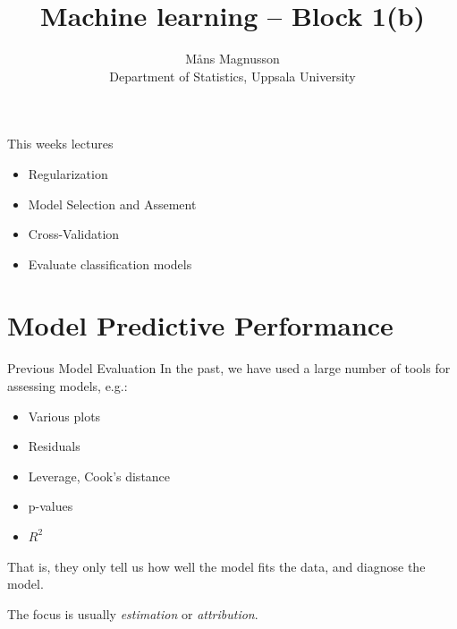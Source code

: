 \documentclass[10pt,handout]{beamer}
\title[]{{\color{black}Machine learning -- Block 1(b)}}
\author[]{M{\aa}ns Magnusson\\Department of Statistics, Uppsala University}
\date{\currentsemester}
\begin{document}
\frame{\titlepage
}



\begin{frame}{This weeks lectures}
\begin{itemize}
\item Regularization
\item Model Selection and Assement
\item Cross-Validation
\item Evaluate classification models
\end{itemize}
\end{frame}




\section{Model Predictive Performance}
\frame{\sectionpage}

\begin{frame}{Previous Model Evaluation}
In the past, we have used a large number of tools for assessing models, e.g.:

\begin{itemize}
\item Various plots
\item Residuals
\item Leverage, Cook's distance
\item p-values
\item $R^2$
\end{itemize}

That is, they only tell us {\color{uured}how well the model fits the data}, and diagnose the model. \pause

The focus is usually \emph{estimation} or \emph{attribution}.
\end{frame}
\end{document}
